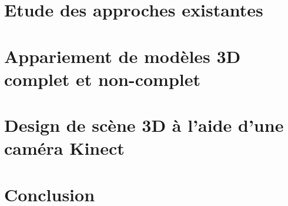 \documentclass[a4paper,11pt]{article}
\begin{document}
\section{Etude des approches existantes}


\section{Appariement de modèles 3D complet et non-complet}


\section{Design de scène 3D à l'aide d'une caméra Kinect}



\section{Conclusion}




\end{document}
